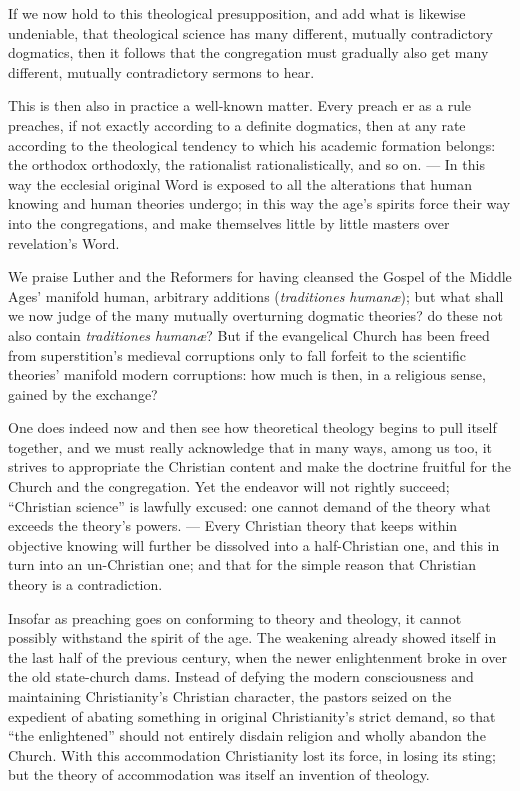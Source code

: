 \documentclass[12pt,a4paper]{book}
\begin{document}
If we now hold to this theological presupposition, and add what is likewise undeniable, that
theological science has many different, mutually contradictory dogmatics, then it follows that the
congregation must gradually also get many different, mutually contradictory sermons to hear.

This is then also in practice a well-known matter. Every preach%
er as a rule preaches, if not exactly according to a definite dogmatics, then at any rate according
to the theological tendency to which his academic formation belongs: the orthodox orthodoxly, the
rationalist rationalistically, and so on. --- In this way the ecclesial original Word is exposed to
all the alterations that human knowing and human theories undergo; in this way the age's spirits
force their way into the congregations, and make themselves little by little
masters over revelation's Word.

We praise Luther and the Reformers for having cleansed the Gospel of the Middle Ages' manifold
human, arbitrary additions (\textit{traditiones humanæ}); but what shall we now judge of the many
mutually overturning dogmatic theories? do these not also contain \textit{traditiones humanæ}? But
if the evangelical Church has been freed from superstition's medieval corruptions only to fall
forfeit to the scientific theories' manifold modern corruptions: how much is then, in a religious
sense, gained by the exchange?

One does indeed now and then see how theoretical theology begins to pull itself together, and we
must really acknowledge that in many ways, among us too, it strives to appropriate the Christian
content and make the doctrine fruitful for the Church and the congregation. Yet the endeavor will
not rightly succeed; ``Christian science'' is lawfully excused: one cannot demand of the theory what
exceeds the theory's powers. --- Every Christian theory that keeps within objective knowing will
further be dissolved into a half-Christian one, and this in turn into an un-Christian one; and that
for the simple reason that Christian theory is a contradiction.

Insofar as preaching goes on conforming to theory and theology, it cannot possibly withstand the
spirit of the age. The weakening already showed itself in the last half of the previous century,
when the newer enlightenment broke in over the old state-church dams. Instead of defying the modern
consciousness
and maintaining Christianity's Christian character, the pastors seized on the expedient of abating
something in original Christianity's strict demand, so that
``the enlightened'' should not entirely disdain religion and wholly abandon the Church. With this
accommodation Christianity lost its force, in losing its sting; but the theory of accommodation was
itself an invention of theology.
\end{document}
